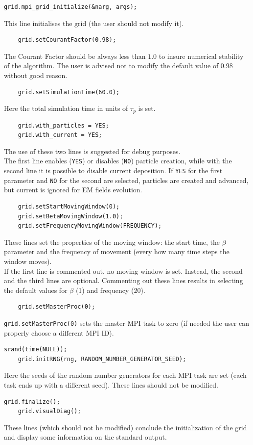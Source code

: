 \documentclass[11pt,a4paper]{report}
\begin{document}
\begin{lstlisting}[backgroundcolor=\color{no_modify}]
	grid.mpi_grid_initialize(&narg, args);
\end{lstlisting}
This line initialises the grid (the user should not modify it). 
\begin{lstlisting}
	grid.setCourantFactor(0.98);
\end{lstlisting}
The Courant Factor should be always less than $1.0$ to insure numerical stability of the algorithm. The user is advised not to modify the default value of 0.98 without good reason.
\begin{lstlisting}
	grid.setSimulationTime(60.0);
\end{lstlisting}
Here the total simulation time in units of $\tau_p$ is set.
\begin{lstlisting}
	grid.with_particles = YES;
	grid.with_current = YES;
\end{lstlisting}
The use of these two lines is suggested for debug purposes.\\
The first line enables (\verb+YES+) or disables (\verb+NO+) particle creation, while with the second line it is possible to disable current deposition. If \verb+YES+ for the first parameter and \verb+NO+ for the second are selected, particles are created and advanced, but current is ignored for EM fields evolution.
\begin{lstlisting}
	grid.setStartMovingWindow(0);
	grid.setBetaMovingWindow(1.0);
	grid.setFrequencyMovingWindow(FREQUENCY);
\end{lstlisting}
These lines set the properties of the moving window: the start time, the $\beta$ parameter and the frequency of movement (every how many time steps the window moves).\\
If the first line is commented out, no moving window is set. Instead, the second and the third lines are optional. Commenting out these lines results in selecting the default values for $\beta$ (1) and frequency (20).
\begin{lstlisting}
	grid.setMasterProc(0);
\end{lstlisting}
\verb+grid.setMasterProc(0)+ sets the master MPI task to zero (if needed the user can properly choose a different MPI ID). 
\begin{lstlisting}[backgroundcolor=\color{no_modify}]
	srand(time(NULL));
	grid.initRNG(rng, RANDOM_NUMBER_GENERATOR_SEED);
\end{lstlisting}
Here the seeds of the random number generators for each MPI task are set (each task ends up with a different seed). These lines should not be modified.
\begin{lstlisting}[backgroundcolor=\color{no_modify}]
	grid.finalize();
	grid.visualDiag();
\end{lstlisting}
These lines (which should not be modified) conclude the initialization of the grid and display some information on the standard output.
\end{document}
